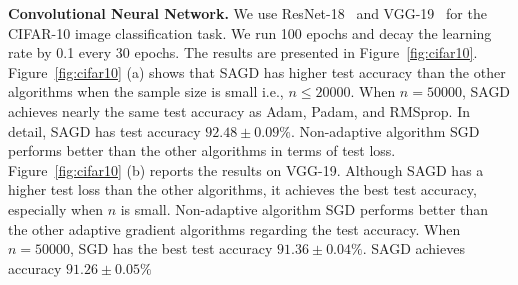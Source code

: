 \documentclass[11pt]{article}
\begin{document}
\vspace{-0.05in}
\textbf{Convolutional Neural Network.}
We use ResNet-18~\citep{hezh2016} and VGG-19~\citep{sizi2014} for the CIFAR-10 image classification task. We run 100 epochs and decay the learning rate by 0.1 every 30 epochs. 
The results are presented in Figure~\ref{fig:cifar10}. Figure~\ref{fig:cifar10} (a) shows that \textsc{SAGD} has higher test accuracy than the 
other algorithms when the sample size is small i.e., $n \leq 20000$.
When $n = 50000$, \textsc{SAGD} achieves nearly the same test accuracy as Adam, Padam, and RMSprop. In detail, \textsc{SAGD} has test accuracy $92.48 \pm 0.09\%$.
Non-adaptive algorithm 
SGD performs better than the other algorithms in terms of test loss. 
Figure~\ref{fig:cifar10} (b) reports the results on VGG-19. Although \textsc{SAGD} has a higher test loss than the other algorithms, it achieves the best test accuracy, especially when $n$ is small. Non-adaptive algorithm SGD performs better than the other adaptive gradient algorithms regarding the test accuracy.
When $n= 50000$, SGD has the best test accuracy $91.36 \pm 0.04\%$. \textsc{SAGD} achieves accuracy $91.26 \pm 0.05\%$


\end{document}
